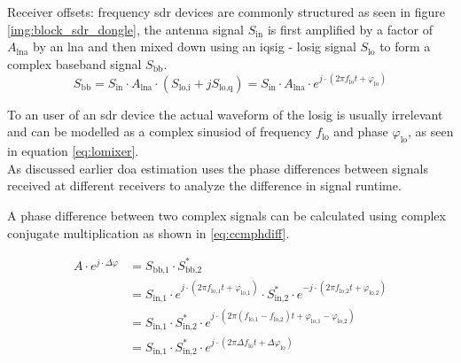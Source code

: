 \begin{subchapter}{Receiver offsets: frequency}
  \Gls{sdr} devices are commonly structured as seen in
  figure \ref{img:block_sdr_dongle}, the antenna signal
  $S_\text{in}$ is first amplified by a factor of
  $A_\text{lna}$ by an \acrshort{lna} and then mixed
  down using an \acrshort{iqsig} - \acrshort{losig} signal
  $S_\text{lo}$ to form a complex baseband signal
  $S_\text{bb}$. \\

  \begin{equation}
    \label{eq:lomixer}
    S_\text{bb}
    = S_\text{in} \cdot A_\text{lna} \cdot
      \left( S_\text{lo,i} + j S_\text{lo,q} \right)
    = S_\text{in} \cdot A_\text{lna} \cdot
      e^{j \cdot \left( 2 \pi f_\text{lo} t + \varphi_\text{lo} \right)}
  \end{equation}

  To an user of an \gls{sdr} device the actual waveform
  of the \gls{losig} is usually irrelevant and can be
  modelled as a complex sinusiod of frequency $f_\text{lo}$
  and phase $\varphi_\text{lo}$, as seen in equation \ref{eq:lomixer}. \\

  As discussed earlier \gls{doa} estimation uses the phase
  differences between signals received at different receivers
  to analyze the difference in signal runtime.

  A phase difference between two complex signals can be
  calculated using complex conjugate multiplication as
  shown in \ref{eq:ccmphdiff}.

  \begin{align}
    \label{eq:ccmphdiff}
    A \cdot e^{j \cdot \Delta \varphi}
    &= S_\text{bb,1} \cdot S_\text{bb,2}^\ast \\
    &= S_\text{in,1} \cdot
       e^{j \cdot \left( 2 \pi f_\text{lo,1} t + \varphi_\text{lo,1} \right)}
       \cdot
       S_\text{in,2}^\ast \cdot
       e^{-j \cdot \left( 2 \pi f_\text{lo,2} t + \varphi_\text{lo,2} \right)} \nonumber \\
    &= S_\text{in,1} \cdot S_\text{in,2}^\ast \cdot
       e^{j \cdot \left(
         2 \pi (f_\text{lo,1} - f_\text{lo,2}) t
         + \varphi_\text{lo,1} - \varphi_\text{lo,2}
       \right)} \nonumber \\
    \label{eq:ccmpoff}
    &= S_\text{in,1} \cdot S_\text{in,2}^\ast \cdot
       e^{j \cdot \left(
         2 \pi \Delta f_\text{lo} t
         + \Delta \varphi_\text{lo}
       \right)}
  \end{align}


\end{subchapter}
